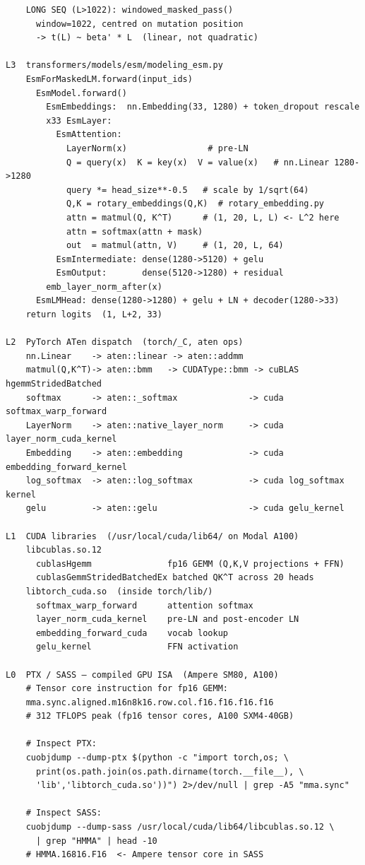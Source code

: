 \documentclass[11pt,a4paper]{article}
\begin{document}
\begin{lstlisting}
    LONG SEQ (L>1022): windowed_masked_pass()
      window=1022, centred on mutation position
      -> t(L) ~ beta' * L  (linear, not quadratic)

L3  transformers/models/esm/modeling_esm.py
    EsmForMaskedLM.forward(input_ids)
      EsmModel.forward()
        EsmEmbeddings:  nn.Embedding(33, 1280) + token_dropout rescale
        x33 EsmLayer:
          EsmAttention:
            LayerNorm(x)                # pre-LN
            Q = query(x)  K = key(x)  V = value(x)   # nn.Linear 1280->1280
            query *= head_size**-0.5   # scale by 1/sqrt(64)
            Q,K = rotary_embeddings(Q,K)  # rotary_embedding.py
            attn = matmul(Q, K^T)      # (1, 20, L, L) <- L^2 here
            attn = softmax(attn + mask)
            out  = matmul(attn, V)     # (1, 20, L, 64)
          EsmIntermediate: dense(1280->5120) + gelu
          EsmOutput:       dense(5120->1280) + residual
        emb_layer_norm_after(x)
      EsmLMHead: dense(1280->1280) + gelu + LN + decoder(1280->33)
    return logits  (1, L+2, 33)

L2  PyTorch ATen dispatch  (torch/_C, aten ops)
    nn.Linear    -> aten::linear -> aten::addmm
    matmul(Q,K^T)-> aten::bmm   -> CUDAType::bmm -> cuBLAS hgemmStridedBatched
    softmax      -> aten::_softmax              -> cuda softmax_warp_forward
    LayerNorm    -> aten::native_layer_norm     -> cuda layer_norm_cuda_kernel
    Embedding    -> aten::embedding             -> cuda embedding_forward_kernel
    log_softmax  -> aten::log_softmax           -> cuda log_softmax kernel
    gelu         -> aten::gelu                  -> cuda gelu_kernel

L1  CUDA libraries  (/usr/local/cuda/lib64/ on Modal A100)
    libcublas.so.12
      cublasHgemm               fp16 GEMM (Q,K,V projections + FFN)
      cublasGemmStridedBatchedEx batched QK^T across 20 heads
    libtorch_cuda.so  (inside torch/lib/)
      softmax_warp_forward      attention softmax
      layer_norm_cuda_kernel    pre-LN and post-encoder LN
      embedding_forward_cuda    vocab lookup
      gelu_kernel               FFN activation

L0  PTX / SASS — compiled GPU ISA  (Ampere SM80, A100)
    # Tensor core instruction for fp16 GEMM:
    mma.sync.aligned.m16n8k16.row.col.f16.f16.f16.f16
    # 312 TFLOPS peak (fp16 tensor cores, A100 SXM4-40GB)

    # Inspect PTX:
    cuobjdump --dump-ptx $(python -c "import torch,os; \
      print(os.path.join(os.path.dirname(torch.__file__), \
      'lib','libtorch_cuda.so'))") 2>/dev/null | grep -A5 "mma.sync"

    # Inspect SASS:
    cuobjdump --dump-sass /usr/local/cuda/lib64/libcublas.so.12 \
      | grep "HMMA" | head -10
    # HMMA.16816.F16  <- Ampere tensor core in SASS
\end{lstlisting}
\end{document}
